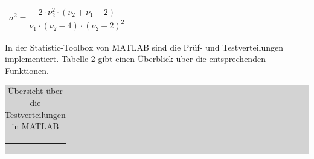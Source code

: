 \begin{table}[H]
{\begin{tabular}{| c | c | c |}
{{$\sigma ^{2} =\dfrac{2\cdot \nu _{2}^{2} \cdot \left(\nu _{2} +\nu _{1} -2\right)}{\nu _{1} \cdot \left(\nu _{2} -4\right)\cdot \left(\nu _{2} -2\right)^{2} } $}}\\
\hline

\end{tabular}%
}
\label{tab:foureightteen}
\end{table}

\clearpage

\noindent In der Statistic-Toolbox von MATLAB sind die Pr\"{u}f- und Testverteilungen implementiert. Tabelle \ref{tab:fournineteen} gibt einen \"{U}berblick \"{u}ber die entsprechenden Funktionen.

\begin{table}[H]
\caption{\"{U}bersicht \"{u}ber die Testverteilungen in MATLAB}
\setlength{\fboxsep}{0pt}%
\colorbox{lightgray}{%
%
\begin{tabular}{| c | c | c | c |}
\hline
\parbox[c][0.7in][c]{1.1in}{\smallskip\centering\textbf{\selectfont{Verteilung}}} & 
\parbox[c][0.7in][c]{1.7in}{\smallskip\centering\textbf{\selectfont{Dichtefunktion f(x)}}} &
\parbox[c][0.7in][c]{1.7in}{\smallskip\centering\textbf{\selectfont{Wahrscheinlichkeits-funktion F(x)}}} &
\parbox[c][0.7in][c]{1.7in}{\smallskip\centering\textbf{\selectfont{inverse Wahrscheinlichkeitsfunktion F-1(x)}}}\\ \hline

\parbox[c][0.3in][c]{1.1in}{\centering{}\selectfont{t-Verteilung}} &
\parbox[c][0.3in][c]{1.7in}{\centering{}\selectfont{tpdf(x,$\nu$)}} &
\parbox[c][0.3in][c]{1.7in}{\centering{}\selectfont{tcdf(x,$\nu$)}} &
\parbox[c][0.3in][c]{1.7in}{\centering{}\selectfont{tinv(P,$\nu$)}} \\ \hline

\parbox[c][0.5in][c]{1.1in}{\centering{}\selectfont{Chi-Quadrat-Verteilung}} &
\parbox[c][0.5in][c]{1.7in}{\centering{}\selectfont{chi2pdf(x,$\nu$)}} &
\parbox[c][0.5in][c]{1.7in}{\centering{}\selectfont{chi2cdf(x,$\nu$}} &
\parbox[c][0.5in][c]{1.7in}{\centering{}\selectfont{chi2inv(P,$\nu$}} \\ \hline

\parbox[c][0.3in][c]{1.1in}{\centering{}\selectfont{f-Verteilung}} &
\parbox[c][0.3in][c]{1.7in}{\centering{}\selectfont{fpdf(x,$\nu$ 1,$\nu$ 2)}} &
\parbox[c][0.3in][c]{1.7in}{\centering{}\selectfont{fcdf(x,$\nu$ 1,$\nu$ 2)}} &
\parbox[c][0.3in][c]{1.7in}{\centering{}\selectfont{finv(P,$\nu$ 1,$\nu$ 2)}} \\ \hline

\end{tabular}%
}\bigskip
\label{tab:fournineteen}
\end{table}

